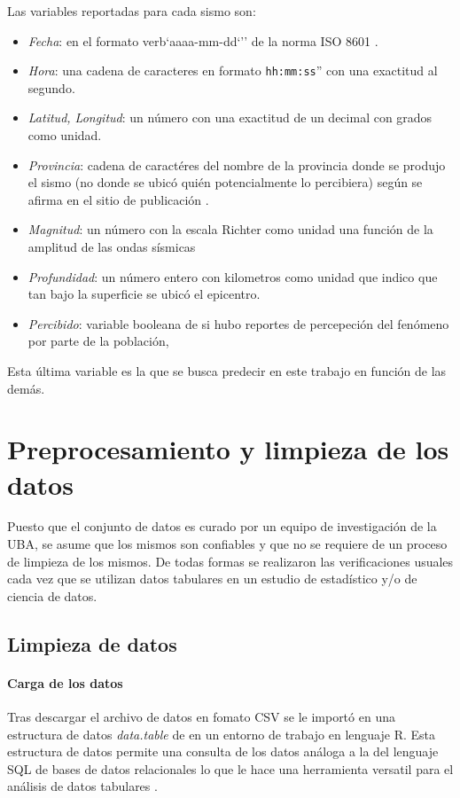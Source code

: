 \documentclass[a4paper]{report}
\begin{document}
Las variables reportadas para cada sismo son:
\begin{itemize}
	\item \emph{Fecha}: en el formato verb`aaaa-mm-dd`'' de la norma ISO 8601 \cite{noauthor_iso_2019}.
	\item \emph{Hora}: una cadena de caracteres en formato \verb`hh:mm:ss`'' con una exactitud al segundo.
	\item \emph{Latitud, Longitud}: un número con una exactitud de un decimal con grados como unidad.
	\item \emph{Provincia}: cadena de caractéres del nombre de la provincia donde se produjo el sismo (no donde se ubicó quién potencialmente lo percibiera) según se afirma en el sitio de publicación \cite[5.1.1]{daniela_parada_ic-datasets-docencia_nodate}.
	\item \emph{Magnitud}: un número con la escala Richter como unidad una función de la amplitud de las ondas sísmicas \cite[sección 4.2.3]{fowler_solid_1990}
	\item \emph{Profundidad}: un número entero con kilometros como unidad que indico que tan bajo la superficie se ubicó el epicentro.
	\item \emph{Percibido}: variable booleana de si hubo reportes de percepeción del fenómeno por parte de la población, 
\end{itemize}
Esta última variable es la que se busca predecir en este trabajo en función de las demás. 



\section{Preprocesamiento y limpieza de los datos}

Puesto que el conjunto de datos es curado por un equipo de investigación de la UBA, se asume que los mismos son confiables y que no se requiere de un proceso de limpieza de los mismos.
De todas formas se realizaron las verificaciones usuales cada vez que se utilizan datos tabulares en un estudio de estadístico y/o de ciencia de datos.


\subsection{Limpieza de datos}

\paragraph{Carga de los datos}
Tras descargar el archivo de datos en fomato CSV se le importó en una estructura de datos \emph{data.table} de en un entorno de trabajo en lenguaje R.
Esta estructura de datos permite una consulta de los datos análoga a la del lenguaje SQL de bases de datos relacionales lo que le hace una herramienta versatil para el análisis de datos tabulares \cite{noauthor_introduction_2024}.
\end{document}
